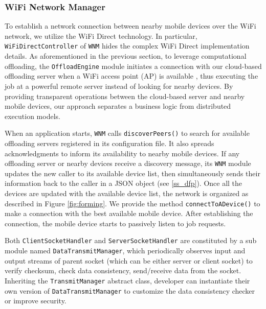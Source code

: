 \documentclass{sig-alternate}[10pt]
\begin{document}
\begin{CCSXML}
\subsubsection{WiFi Network Manager}
To establish a network connection between nearby mobile devices over the WiFi network, we utilize the WiFi Direct technology. In particular, \texttt{WiFiDirectController} of \texttt{WNM} hides the complex WiFi Direct implementation details. As aforementioned in the previous section, to leverage computational offloading, the \texttt{OffloadEngine} module initiates a connection with our cloud-based offloading server when a WiFi access point (AP) is available \cite{kwon+:mobilesoft2015}, thus executing the job at a powerful remote server instead of looking for nearby devices. By providing transparent operations between the cloud-based server and nearby mobile devices, our approach separates a business logic from distributed execution models.

When an application starts, \texttt{WNM} calls \texttt{discoverPeers()} to search for available offloading servers registered in its configuration file. It also spreads acknowledgments to inform its availability to nearby mobile devices. If any offloading server or nearby devices receive a discovery message, its \texttt{WNM} module updates the new caller to its available device list, then simultaneously sends their information back to the caller in a JSON object (see \ref{ss_dfp}). Once all the devices are updated with the available device list, the network is organized as described in Figure \ref{fig:forming}. We provide the method \texttt{connectToADevice()} to make a connection with the best available mobile device. After establishing the connection, the mobile device starts to passively listen to job requests.


Both \texttt{ClientSocketHandler} and \texttt{ServerSocketHandler} are constituted by a sub module named \texttt{DataTransmitManager}, which periodically observes input and output streams of parent socket (which can be either server or client socket) to verify checksum, check data consistency, send/receive data from the socket. Inheriting the \texttt{TransmitManager} abstract class, developer can instantiate their own version of \texttt{DataTransmitManager} to customize the data consistency checker or improve security. 


\end{CCSXML}
\end{document}
